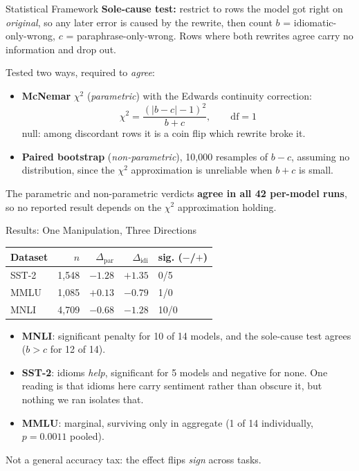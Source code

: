 \documentclass[10pt]{beamer}
\begin{document}
\begin{frame}{Statistical Framework}
  \textbf{Sole-cause test:} restrict to rows the model got right on
  \emph{original}, so any later error is caused by the rewrite, then count
  $b$ = idiomatic-only-wrong, $c$ = paraphrase-only-wrong. Rows where both
  rewrites agree carry no information and drop out.

  \vspace{0.3em}
  Tested two ways, required to \emph{agree}:
  \begin{itemize}
    \item \textbf{McNemar} $\chi^2$ (\emph{parametric}) with the Edwards
      continuity correction:
      \[
        \chi^2 = \frac{(|b - c| - 1)^2}{b + c}, \qquad \mathrm{df} = 1
      \]
      null: among discordant rows it is a coin flip which rewrite broke it.
    \item \textbf{Paired bootstrap} (\emph{non-parametric}), 10{,}000 resamples
      of $b - c$, assuming no distribution, since the $\chi^2$ approximation is
      unreliable when $b + c$ is small.
  \end{itemize}
  The parametric and non-parametric verdicts \textbf{agree in all 42 per-model
  runs}, so no reported result depends on the $\chi^2$ approximation holding.
\end{frame}

\begin{frame}{Results: One Manipulation, Three Directions}
  \centering
  \begin{tabular}{lrrrl}
    \toprule
    Dataset & $n$ & $\Delta_{\text{par}}$ & $\Delta_{\text{idi}}$ & sig. ($-$/$+$) \\
    \midrule
    SST-2 & 1{,}548 & $-1.28$ & $\mathbf{+1.35}$ & 0/5 \\
    MMLU  & 1{,}085 & $+0.13$ & $-0.79$          & 1/0 \\
    MNLI  & 4{,}709 & $-0.68$ & $\mathbf{-1.28}$ & 10/0 \\
    \bottomrule
  \end{tabular}
  \vspace{1em}
  \raggedright

  \begin{itemize}
    \item \textbf{MNLI}: significant penalty for 10 of 14 models, and the
      sole-cause test agrees ($b > c$ for 12 of 14).
    \item \textbf{SST-2}: idioms \emph{help}, significant for 5 models and
      negative for none. One reading is that idioms here carry sentiment rather
      than obscure it, but nothing we ran isolates that.
    \item \textbf{MMLU}: marginal, surviving only in aggregate (1 of 14
      individually, $p = 0.0011$ pooled).
  \end{itemize}
  \vspace{0.2em}
  Not a general accuracy tax: the effect flips \emph{sign} across tasks.
\end{frame}
\end{document}
